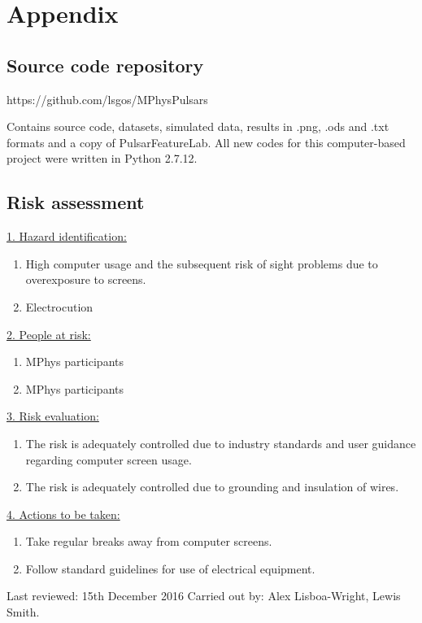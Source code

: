 \documentclass[12pt]{article}
\begin{document}
\begin{small}


\end{small}

\section{Appendix}
\subsection{Source code repository}
https://github.com/lsgos/MPhysPulsars

Contains source code, datasets, simulated data, results in .png, .ods and .txt formats and a copy of PulsarFeatureLab. All new codes for this computer-based project were written in Python 2.7.12.

\subsection{Risk assessment}
\underline{1. Hazard identification:}
\begin{enumerate}[label=(\roman*)]
\item High computer usage and the subsequent risk of sight problems due to overexposure to screens.
\item Electrocution
\end{enumerate}
\underline{2. People at risk:}
\begin{enumerate}[label=(\roman*)]
\item MPhys participants
\item MPhys participants
\end{enumerate}
\underline{3. Risk evaluation:}
\begin{enumerate}[label=(\roman*)]
\item The risk is adequately controlled due to industry standards and user guidance regarding computer screen usage.
\item The risk is adequately controlled due to grounding and insulation of wires.
\end{enumerate}
\underline{4. Actions to be taken:}
\begin{enumerate}[label=(\roman*)]
\item Take regular breaks away from computer screens.
\item Follow standard guidelines for use of electrical equipment.
\end{enumerate}
Last reviewed: 15th December 2016 \newline
Carried out by: Alex Lisboa-Wright, Lewis Smith.
\end{document}
